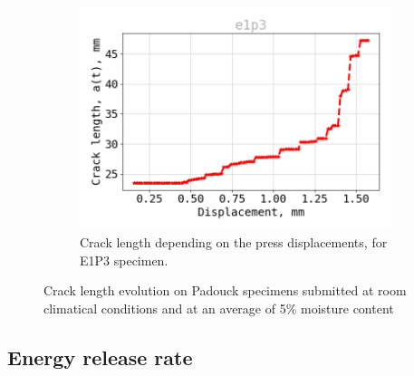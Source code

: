\begin{figure}[H]
	\begin{subfigure}{0.48\linewidth}
		\centering
		\includegraphics[width=\textwidth]{Figures/e1p3_a}
		\decoRule
		\caption[Crack length E1P3]{Crack length depending on the press displacements, for E1P3 specimen.}
		\label{fig:E1P3_a}
	\end{subfigure}
	\caption{Crack length evolution on Padouck specimens submitted at room climatical conditions and at an average of 5\% moisture content}
	\label{E1p_a}
\end{figure}

\subsection{Energy release rate}


